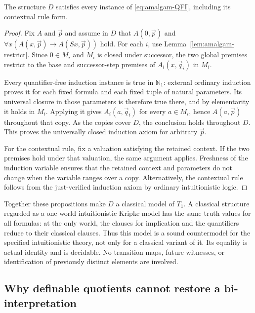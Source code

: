 \begin{proposition}
\label{prop:amalgam-qfi}
The structure $D$ satisfies every instance of
\eqref{eq:amalgam-QFI}, including its contextual rule form.
\end{proposition}
\begin{proof}
Fix $A$ and $\vec p$ and assume in $D$ that
$A(0,\vec p)$ and
$\forall x(A(x,\vec p)\to A(Sx,\vec p))$ hold.
For each $i$, use Lemma~\ref{lem:amalgam-restrict}. Since
$0\in M_i$ and $M_i$ is closed under successor, the two global
premises restrict to the base and successor-step premises of
$A_i(x,\vec q_i)$ in $M_i$.

Every quantifier-free induction instance is true in $\mathbb N_1$:
external ordinary induction proves it for each fixed formula and
each fixed tuple of natural parameters. Its universal closure in
those parameters is therefore true there, and by elementarity it
holds in $M_i$. Applying it gives $A_i(a,\vec q_i)$ for every
$a\in M_i$, hence $A(a,\vec p)$ throughout that copy.
As the copies cover $D$, the conclusion holds throughout $D$.
This proves the universally closed induction axiom for arbitrary
$\vec p$.

For the contextual rule, fix a valuation satisfying the retained
context. If the two premises hold under that valuation, the same
argument applies. Freshness of the induction variable ensures that
the retained context and parameters do not change when the variable
ranges over a copy. Alternatively, the contextual rule follows from
the just-verified induction axiom by ordinary intuitionistic logic.
\end{proof}

Together these propositions make $D$ a classical model of $T_1$.
A classical structure regarded as a one-world intuitionistic Kripke
model has the same truth values for all formulas: at the only world,
the clauses for implication and the quantifiers reduce to their
classical clauses. Thus this model is a sound countermodel for the
specified intuitionistic theory, not only for a classical variant of
it. Its equality is actual identity and is decidable. No transition
maps, future witnesses, or identification of previously distinct
elements are involved.

\subsection{Why definable quotients cannot restore a bi-interpretation}
\label{subsec:amalgam-biinterpretation}

